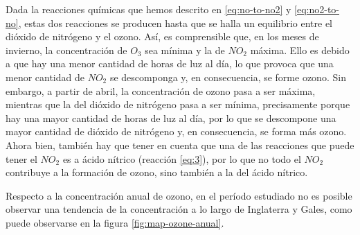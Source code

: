 \documentclass[12pt]{article}
\begin{document}
Dada la reacciones químicas que hemos descrito en \ref{eq:no-to-no2} y \ref{eq:no2-to-no}, estas dos reacciones se producen hasta que se halla un equilibrio entre el dióxido de nitrógeno y el ozono. Así, es comprensible que, en los meses de invierno, la concentración de $O_{3}$ sea mínima y la de $NO_{2}$ máxima. Ello es debido a que hay una menor cantidad de horas de luz al día, lo que provoca que una menor cantidad de $NO_{2}$ se descomponga y, en consecuencia, se forme ozono. Sin embargo, a partir de abril, la concentración de ozono pasa a ser máxima, mientras que la del dióxido de nitrógeno pasa a ser mínima, precisamente porque hay una mayor cantidad de horas de luz al día, por lo que se descompone una mayor cantidad de dióxido de nitrógeno y, en consecuencia, se forma más ozono. Ahora bien, también hay que tener en cuenta que una de las reacciones que puede tener el $NO_{2}$ es a ácido nítrico (reacción \ref{eq:3}), por lo que no todo el $NO_{2}$ contribuye a la formación de ozono, sino también a la del ácido nítrico.

Respecto a la concentración anual de ozono, en el período estudiado no es posible observar una tendencia de la concentración a lo largo de Inglaterra y Gales, como puede observarse en la figura \ref{fig:map-ozone-anual}.
\end{document}
